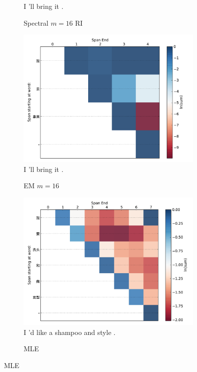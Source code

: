\documentclass[11pt]{article}
\begin{document}
\begin{figure}[t!]
\begin{center}
\begin{subfigure}{0.67\columnwidth}
		I 'll bring it .
		\caption {\small Spectral $m=16$ RI}
		\label{fig:spec0}
	\end{subfigure}
	\begin{subfigure}{0.67\columnwidth}
		\centering
		\includegraphics[width=1.1\columnwidth,keepaspectratio=true]{./em0.pdf}		
		I 'll bring it .
		\caption {\small EM $m=16$}
		\label{fig:em0}
	\end{subfigure}
	\end{center}
	\begin{center}
	\begin{subfigure}{0.67\columnwidth}
		\centering
		\includegraphics[width=1.1\columnwidth,keepaspectratio=true]{./mle1.pdf}	
		I 'd like a shampoo and style .
		\caption{\small MLE}

\end{subfigure}
\end{center}
\end{figure}
\end{document}
